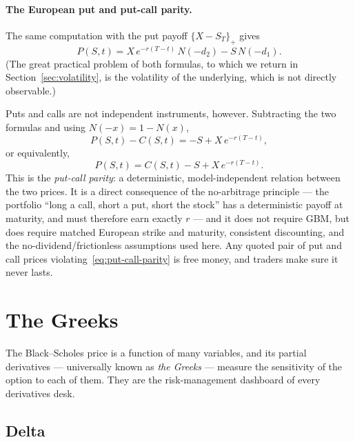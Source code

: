 \paragraph*{The European put and put-call parity.}

The same computation with the put payoff $\{X-S_T\}_+$ gives
\begin{equation}\label{eq:bs-put}
P(S,t) = X\, e^{-r(T-t)}\, N(-d_2) - S\, N(-d_1).
\end{equation}
(The great practical problem of both formulas, to which we return in Section~\ref{sec:volatility}, is the volatility of the underlying, which is not directly observable.)

Puts and calls are not independent instruments, however.
Subtracting the two formulas and using $N(-x)=1-N(x)$,
\begin{equation}
P(S,t) - C(S,t) = -S + X\, e^{-r(T-t)},
\end{equation}
or equivalently,
\begin{equation}\label{eq:put-call-parity}
P(S,t) = C(S,t) - S + X\, e^{-r(T-t)}.
\end{equation}
This is the \emph{put-call parity}: a deterministic, model-independent relation between the two prices.
It is a direct consequence of the no-arbitrage principle --- the portfolio ``long a call, short a put, short the stock'' has a deterministic payoff at maturity, and must therefore earn exactly $r$ --- and it does not require GBM, but does require matched European strike and maturity, consistent discounting, and the no-dividend/frictionless assumptions used here.
Any quoted pair of put and call prices violating~\eqref{eq:put-call-parity} is free money, and traders make sure it never lasts.


\section{The Greeks}\label{sec:greeks}

The Black--Scholes price is a function of many variables, and its partial derivatives --- universally known as \emph{the Greeks} --- measure the sensitivity of the option to each of them.
They are the risk-management dashboard of every derivatives desk.

\subsection{Delta}

